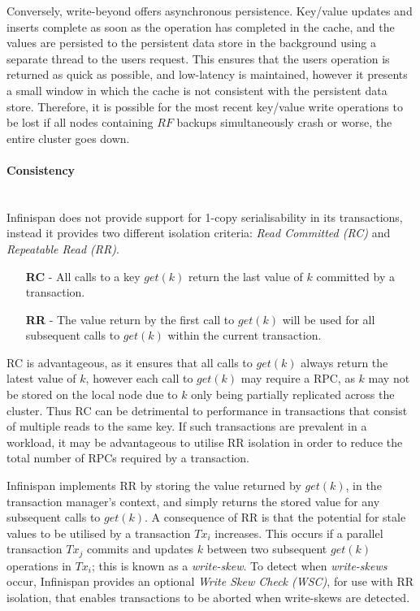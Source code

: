 		    Conversely, write-beyond offers asynchronous persistence.  Key/value updates and inserts complete as soon as the operation has completed in the cache, and the values are persisted to the persistent data store in the background using a separate thread to the users request.  This ensures that the users operation is returned as quick as possible, and low-latency is maintained, however it presents a small window in which the cache is not consistent with the persistent data store.  Therefore, it is possible for the most recent key/value write operations to be lost if all nodes containing $RF$ backups simultaneously crash or worse, the entire cluster goes down.  
    
	        \paragraph{Consistency} \hspace{0pt} \\ \label{consistency}
	        Infinispan does not provide support for 1-copy serialisability in its transactions, instead it provides two different isolation criteria: \emph{Read Committed (RC)} and \emph{Repeatable Read (RR)}.  
	        
	        \begin{itemize}
	            \item[\textbf{RC} -] All calls to a key $get(k)$ return the last value of $k$ committed by a transaction.  
	            \item[\textbf{RR} -] The value return by the first call to $get(k)$ will be used for all subsequent calls to $get(k)$ within the current transaction.
	        \end{itemize}   
	        
	        RC is advantageous, as it ensures that all calls to $get(k)$ always return the latest value of $k$, however each call to $get(k)$ may require a RPC, as $k$ may not be stored on the local node due to $k$ only being partially replicated across the cluster. Thus RC can be detrimental to performance in transactions that consist of multiple reads to the same key.  If such transactions are prevalent in a workload, it may be advantageous to utilise RR isolation in order to reduce the total number of RPCs required by a transaction.  
	        
	        Infinispan implements RR by storing the value returned by $get(k)$, in the transaction manager's context, and simply returns the stored value for any subsequent calls to $get(k)$.  A consequence of RR is that the potential for stale values to be utilised by a transaction $Tx_i$ increases.  This occurs if a parallel transaction $Tx_j$ commits and updates $k$ between two subsequent $get(k)$ operations in $Tx_i$; this is known as a \emph{write-skew}.  To detect when \emph{write-skews}\label{write-skew} occur, Infinispan provides an optional \emph{Write Skew Check (WSC)}, for use with RR isolation, that enables transactions to be aborted when write-skews are detected.  
	        
